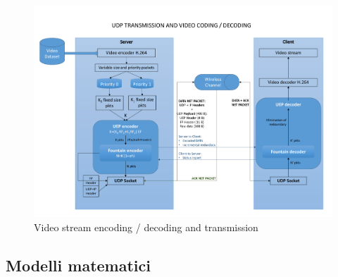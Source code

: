 \documentclass[italian, a4paper, 12pt]{article}
\begin{document}
\begin{figure}[htb]
    \centering
        \includegraphics[clip, trim=0cm 1cm 0cm 1cm, width=1.00\textwidth]{UDP.pdf}
    \caption{Video stream encoding / decoding and transmission}
    \label{fig:UDP}
\end{figure}

%
%
\subsection{Modelli matematici}
\end{document}
